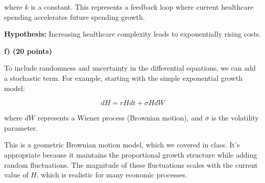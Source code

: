 \documentclass{article}
\begin{document}
where $k$ is a constant. This represents a feedback loop where current healthcare spending accelerates future spending growth.

\textbf{Hypothesis:} Increasing healthcare complexity leads to exponentially rising costs.

\textbf{f) (20 points)}

To include randomness and uncertainty in the differential equations, we can add a stochastic term. For example, starting with the simple exponential growth model:

$$dH = rH dt + \sigma H dW$$

where $dW$ represents a Wiener process (Brownian motion), and $\sigma$ is the volatility parameter.

This is a geometric Brownian motion model, which we covered in class. It's appropriate because it maintains the proportional growth structure while adding random fluctuations. The magnitude of these fluctuations scales with the current value of $H$, which is realistic for many economic processes.
\end{document}
